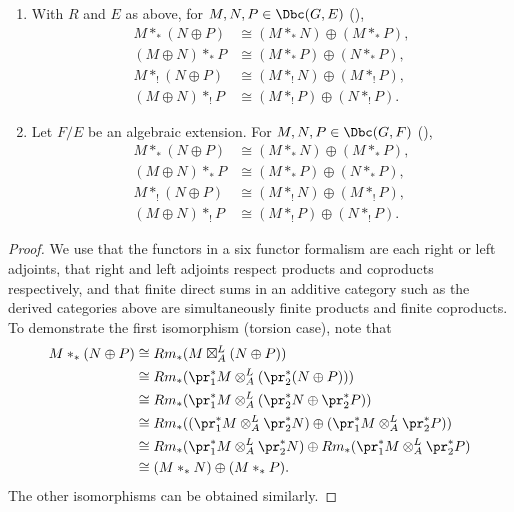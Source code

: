 \begin{proposition}
\begin{enumerate}
        \item[\textbf{(c) Rational adic coefficients.}] With $R$ and $E$ as above, for $M, N, P \in \Dbc(G,E)$ (),
        \begin{align*}
            M *_* (N \oplus P) &\cong (M *_* N) \oplus (M *_* P), \\
            (M \oplus N) *_* P &\cong (M *_* P) \oplus (N *_* P), \\
            M *_! (N \oplus P) &\cong (M *_! N) \oplus (M *_! P), \\
            (M \oplus N) *_! P &\cong (M *_! P) \oplus (N *_! P).
        \end{align*}

        \item[\textbf{(d) Algebraic adic coefficients.}] Let $F/E$ be an algebraic extension. For $M, N, P \in \Dbc(G,F)$ (),
        \begin{align*}
            M *_* (N \oplus P) &\cong (M *_* N) \oplus (M *_* P), \\
            (M \oplus N) *_* P &\cong (M *_* P) \oplus (N *_* P), \\
            M *_! (N \oplus P) &\cong (M *_! N) \oplus (M *_! P), \\
            (M \oplus N) *_! P &\cong (M *_! P) \oplus (N *_! P).
        \end{align*}
    \end{enumerate}
\end{proposition}

\begin{proof}
    We use that the functors in a six functor formalism are each right or left adjoints, that right and left adjoints respect products and coproducts respectively, and that finite direct sums in an additive category such as the derived categories above are simultaneously finite products and finite coproducts. To demonstrate the first isomorphism (torsion case), note that
    \begin{align*}
        M *_* (N \oplus P) &\cong Rm_*(M \boxtimes_A^L (N \oplus P)) \\
        &\cong Rm_*(\pr_1^* M \otimes_A^L (\pr_2^* (N \oplus P))) \\
        &\cong Rm_*(\pr_1^* M \otimes_A^L (\pr_2^* N \oplus \pr_2^* P)) \\
        &\cong Rm_*((\pr_1^* M \otimes_A^L \pr_2^* N) \oplus (\pr_1^* M \otimes_A^L \pr_2^* P)) \\
        &\cong Rm_*(\pr_1^* M \otimes_A^L \pr_2^* N) \oplus Rm_*(\pr_1^* M \otimes_A^L \pr_2^* P) \\
        &\cong (M *_* N) \oplus (M *_* P).
    \end{align*}
    The other isomorphisms can be obtained similarly.
\end{proof}
